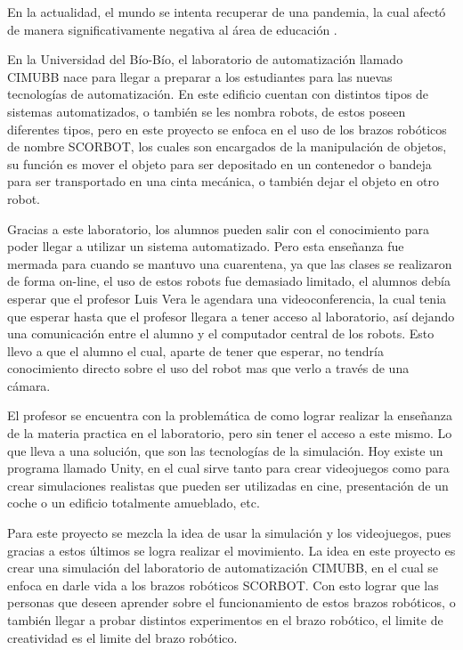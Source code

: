 En la actualidad, el mundo se intenta recuperar de una pandemia, la cual afectó de manera significativamente negativa al área de educación \cite{Educacion}.


En la Universidad del Bío-Bío, el laboratorio de automatización llamado CIMUBB nace para llegar a preparar a los estudiantes para las nuevas tecnologías de automatización. En este edificio cuentan con distintos tipos de sistemas automatizados, o también se les nombra robots, de estos poseen diferentes tipos, pero en este proyecto se enfoca en el uso de los brazos robóticos de nombre SCORBOT, los cuales son encargados de la manipulación de objetos, su función es mover el objeto para ser depositado en un contenedor o bandeja para ser transportado en una cinta mecánica, o también dejar el objeto en otro robot. 

Gracias a este laboratorio, los alumnos pueden salir con el conocimiento para poder llegar a utilizar un sistema automatizado. Pero esta enseñanza fue mermada para cuando se mantuvo una cuarentena, ya que las clases se realizaron de forma on-line, el uso de estos robots fue demasiado limitado, el alumnos debía esperar que el profesor Luis Vera le agendara una videoconferencia, la cual tenia que esperar hasta que el profesor llegara a tener acceso al laboratorio, así dejando una comunicación entre el alumno y el computador central de los robots. Esto llevo a que el alumno el cual, aparte de tener que esperar, no tendría conocimiento directo sobre el uso del robot mas que verlo a través de una cámara.

El profesor se encuentra con la problemática de como lograr realizar la enseñanza de la materia practica en el laboratorio, pero sin tener el acceso a este mismo. Lo que lleva a una solución, que son las tecnologías de la simulación. Hoy existe un programa llamado Unity, en el cual sirve tanto para crear videojuegos como para crear simulaciones realistas que pueden ser utilizadas en cine, presentación de un coche o un edificio totalmente amueblado, etc.

Para este proyecto se mezcla la idea de usar la simulación y los videojuegos, pues gracias a estos últimos se logra realizar el movimiento. La idea en este proyecto es crear una simulación del laboratorio de automatización CIMUBB, en el cual se enfoca en darle vida a los brazos robóticos SCORBOT. Con esto lograr que las personas que deseen aprender sobre el funcionamiento de estos brazos robóticos, o también llegar a probar distintos experimentos en el brazo robótico, el limite de creatividad es el limite del brazo robótico.

